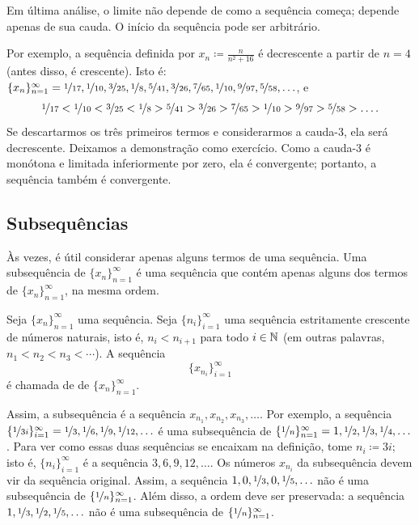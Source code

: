 Em última análise, o limite não depende de como a sequência começa; depende
apenas de sua cauda. O início da sequência pode ser arbitrário.

Por exemplo, a sequência definida por $x_n \coloneqq \frac{n}{n^2+16}$ é
decrescente a partir de $n=4$ (antes disso, é crescente). Isto é:
$\{ x_n \}_{n=1}^\infty =
\nicefrac{1}{17},
\nicefrac{1}{10},
\nicefrac{3}{25},
\nicefrac{1}{8},
\nicefrac{5}{41},
\nicefrac{3}{26},
\nicefrac{7}{65},
\nicefrac{1}{10},
\nicefrac{9}{97},
\nicefrac{5}{58},\ldots$, e
\begin{equation*}
\nicefrac{1}{17} <
\nicefrac{1}{10} <
\nicefrac{3}{25} <
\nicefrac{1}{8} >
\nicefrac{5}{41} >
\nicefrac{3}{26} >
\nicefrac{7}{65} >
\nicefrac{1}{10} >
\nicefrac{9}{97} >
\nicefrac{5}{58} > \ldots .
\end{equation*}
Se descartarmos os três primeiros termos e considerarmos a cauda-$3$, ela
será decrescente. Deixamos a demonstração como exercício. Como a cauda-$3$
é monótona e limitada inferiormente por zero, ela é convergente; portanto,
a sequência também é convergente.

\subsection{Subsequ\^encias}

Às vezes, é útil considerar apenas alguns termos de uma sequência.
Uma subsequência de $\{ x_n \}_{n=1}^\infty$ é uma sequência que contém
apenas alguns dos termos de $\{ x_n \}_{n=1}^\infty$, na mesma ordem.

\begin{defn}
Seja $\{ x_n \}_{n=1}^\infty$ uma sequência.
Seja $\{ n_i \}_{i=1}^\infty$ uma sequência estritamente crescente de
números naturais, isto é, $n_i < n_{i+1}$ para todo $i \in {\mathbb{N}}$ (em outras
palavras, $n_1 < n_2 < n_3 < \cdots$).
A sequência
\begin{equation*}
\{ x_{n_i} \}_{i=1}^\infty
\end{equation*}
é chamada de 
\emph{} de $\{ x_n \}_{n=1}^\infty$.
\end{defn}

Assim, a subsequência é a sequência $x_{n_1},x_{n_2},x_{n_3},\ldots$.
Por exemplo, a sequência
$\{ \nicefrac{1}{3i} \}_{i=1}^\infty
= \nicefrac{1}{3},\nicefrac{1}{6},\nicefrac{1}{9},\nicefrac{1}{12},\ldots$
é uma subsequência de
$\{ \nicefrac{1}{n} \}_{n=1}^\infty
= 1, \nicefrac{1}{2},\nicefrac{1}{3},\nicefrac{1}{4},\ldots$.
Para ver como essas duas sequências se encaixam na definição, tome
$n_i \coloneqq 3i$; isto é, $\{ n_i \}_{i=1}^\infty$ é a sequência
$3,6,9,12,\ldots$.
Os números $x_{n_i}$ da subsequência devem vir da sequência original.
Assim, a sequência $1,0,\nicefrac{1}{3},0,
\nicefrac{1}{5},\ldots$ não é uma subsequência de $\{ \nicefrac{1}{n} \}_{n=1}^\infty$.
Além disso, a ordem deve ser preservada: a sequência
$1,\nicefrac{1}{3},\nicefrac{1}{2},\nicefrac{1}{5},\ldots$
não é uma subsequência de $\{ \nicefrac{1}{n} \}_{n=1}^\infty$.

